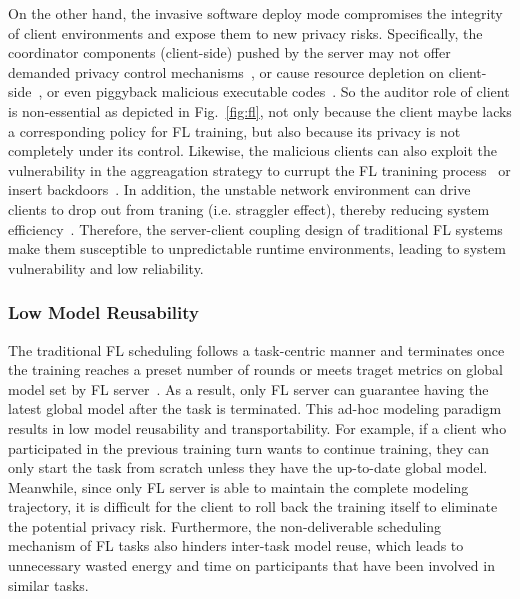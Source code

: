 On the other hand, the invasive software deploy mode compromises the integrity of client environments and expose them to new privacy risks.
Specifically, the coordinator components (client-side) pushed by the server may not offer demanded privacy control mechanisms~\cite{zeng2021fedlab, caldas2018leaf, mcmahan2017communication}, or cause resource depletion on client-side~\cite{bonawitz2019towards, niu2020billion, chen2020deep}, or even piggyback malicious executable codes~\cite{li2017understanding}.
So the auditor role of client is non-essential as depicted in Fig.~\ref{fig:fl}, not only because the client maybe lacks a corresponding policy for FL training, but also because its privacy is not completely under its control.
Likewise, the malicious clients can also exploit the vulnerability in the aggreagation strategy to currupt the FL tranining process~\cite{bouacida2021vulnerabilities, sattler2020byzantine, park2021sageflow, fang2020local} or insert backdoors~\cite{bagdasaryan2020backdoor, wang2020attack}.
In addition, the unstable network environment can drive clients to drop out from traning (i.e. straggler effect), thereby reducing system efficiency~\cite{reisizadeh2019robust, park2021sageflow}.
Therefore, the server-client coupling design of traditional FL systems make them susceptible to unpredictable runtime environments, leading to system vulnerability and low reliability.

\subsubsection{Low Model Reusability} %
The traditional FL scheduling follows a task-centric manner and terminates once the training reaches a preset number of rounds or meets traget metrics on global model set by FL server~\cite{bonawitz2019towards}.
As a result, only FL server can guarantee having the latest global model after the task is terminated.
This ad-hoc modeling paradigm results in low model reusability and transportability.
For example, if a client who participated in the previous training turn wants to continue training, they can only start the task from scratch unless they have the up-to-date global model.
Meanwhile, since only FL server is able to maintain the complete modeling trajectory, it is difficult for the client to roll back the training itself to eliminate the potential privacy risk.
Furthermore, the non-deliverable scheduling mechanism of FL tasks also hinders inter-task model reuse, which leads to unnecessary wasted energy and time on participants that have been involved in similar tasks.

